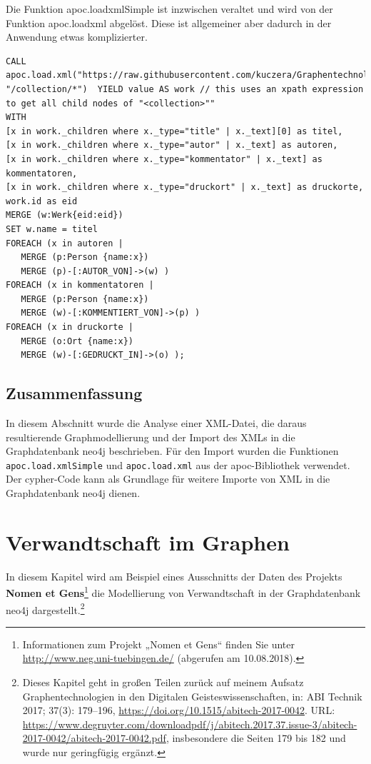 \documentclass[ngerman,]{scrreprt}
\begin{document}
Die Funktion apoc.loadxmlSimple ist inzwischen veraltet und wird von der Funktion apoc.loadxml abgelöst. Diese ist allgemeiner aber dadurch in der Anwendung etwas komplizierter.

\begin{verbatim}
CALL
apoc.load.xml("https://raw.githubusercontent.com/kuczera/Graphentechnologien/master/docs/data/kollatz.xml", "/collection/*")  YIELD value AS work // this uses an xpath expression to get all child nodes of "<collection>""
WITH
[x in work._children where x._type="title" | x._text][0] as titel,
[x in work._children where x._type="autor" | x._text] as autoren,
[x in work._children where x._type="kommentator" | x._text] as kommentatoren,
[x in work._children where x._type="druckort" | x._text] as druckorte,
work.id as eid
MERGE (w:Werk{eid:eid})
SET w.name = titel
FOREACH (x in autoren |
   MERGE (p:Person {name:x})
   MERGE (p)-[:AUTOR_VON]->(w) )
FOREACH (x in kommentatoren |
   MERGE (p:Person {name:x})
   MERGE (w)-[:KOMMENTIERT_VON]->(p) )
FOREACH (x in druckorte |
   MERGE (o:Ort {name:x})
   MERGE (w)-[:GEDRUCKT_IN]->(o) );
\end{verbatim}

\section{Zusammenfassung}\label{zusammenfassung-2}

In diesem Abschnitt wurde die Analyse einer XML-Datei, die daraus resultierende Graphmodellierung und der Import des XMLs in die Graphdatenbank neo4j beschrieben. Für den Import wurden die Funktionen \texttt{apoc.load.xmlSimple} und \texttt{apoc.load.xml} aus der apoc-Bibliothek verwendet. Der cypher-Code kann als Grundlage für weitere Importe von XML in die Graphdatenbank neo4j dienen.

\chapter{Verwandtschaft im Graphen}\label{verwandtschaft-im-graphen}

In diesem Kapitel wird am Beispiel eines Ausschnitts der Daten des Projekts \textbf{Nomen et Gens}\footnote{Informationen zum Projekt „Nomen et Gens`` finden Sie unter \url{http://www.neg.uni-tuebingen.de/} (abgerufen am 10.08.2018).} die Modellierung von Verwandtschaft in der Graphdatenbank neo4j dargestellt.\footnote{Dieses Kapitel geht in großen Teilen zurück auf meinem Aufsatz Graphentechnologien in den Digitalen Geisteswissenschaften, in: ABI Technik 2017; 37(3): 179--196, \url{https://doi.org/10.1515/abitech-2017-0042}. URL: \url{https://www.degruyter.com/downloadpdf/j/abitech.2017.37.issue-3/abitech-2017-0042/abitech-2017-0042.pdf}, insbesondere die Seiten 179 bis 182 und wurde nur geringfügig ergänzt.}
\end{document}
